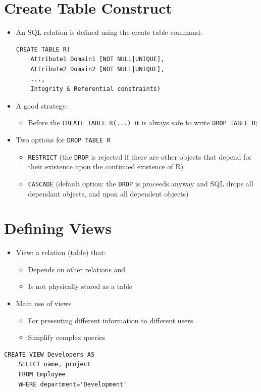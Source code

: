 \documentclass{article}[18pt]
\begin{document}
\section{Create Table Construct}
\begin{itemize}
	\item An SQL relation is defined using the create table command:
	\begin{verbatim}
CREATE TABLE R(
	Attribute1 Domain1 [NOT NULL|UNIQUE],
	Attribute2 Domain2 [NOT NULL|UNIQUE],
	...,
	Integrity & Referential constraints)
	\end{verbatim}
	\item A good strategy:
	\begin{itemize}
		\item Before the \texttt{CREATE TABLE R(...) }it is always safe to write \texttt{DROP TABLE R};
	\end{itemize}
	\item Two options for \texttt{DROP TABLE R}
	\begin{itemize}
		\item \texttt{RESTRICT} (the \texttt{DROP} is rejected if there are other objects that depend for their existence upon the continued existence of R)
		\item \texttt{CASCADE} (default option: the \texttt{DROP} is proceeds anyway and SQL drops all dependant objects, and upon all dependent objects)
	\end{itemize}
\end{itemize}
\section{Defining Views}
\begin{itemize}
	\item View: a relation (table) that:
	\begin{itemize}
		\item Depends on other relations and
		\item Is not physically stored as a table
	\end{itemize}
	\item Main use of views
	\begin{itemize}
		\item For presenting different information to different users
		\item Simplify complex queries
	\end{itemize}
\end{itemize}
\begin{verbatim}
CREATE VIEW Developers AS
	SELECT name, project
	FROM Employee
	WHERE department='Development'
\end{verbatim}
\end{document}
